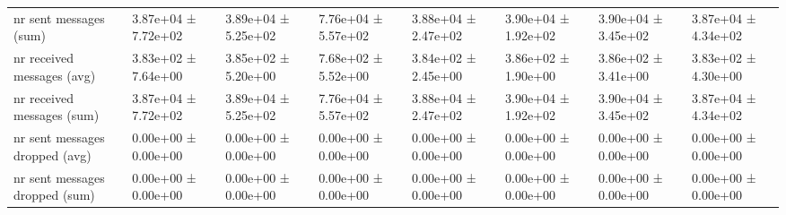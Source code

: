 \begin{tabular}{llllllll}
 nr sent messages (sum)             & 3.87e+04 ± 7.72e+02 & 3.89e+04 ± 5.25e+02 & 7.76e+04 ± 5.57e+02 & 3.88e+04 ± 2.47e+02 & 3.90e+04 ± 1.92e+02 & 3.90e+04 ± 3.45e+02 & 3.87e+04 ± 4.34e+02 \\
 nr received messages (avg)         & 3.83e+02 ± 7.64e+00 & 3.85e+02 ± 5.20e+00 & 7.68e+02 ± 5.52e+00 & 3.84e+02 ± 2.45e+00 & 3.86e+02 ± 1.90e+00 & 3.86e+02 ± 3.41e+00 & 3.83e+02 ± 4.30e+00 \\
 nr received messages (sum)         & 3.87e+04 ± 7.72e+02 & 3.89e+04 ± 5.25e+02 & 7.76e+04 ± 5.57e+02 & 3.88e+04 ± 2.47e+02 & 3.90e+04 ± 1.92e+02 & 3.90e+04 ± 3.45e+02 & 3.87e+04 ± 4.34e+02 \\
 nr sent messages dropped (avg)     & 0.00e+00 ± 0.00e+00 & 0.00e+00 ± 0.00e+00 & 0.00e+00 ± 0.00e+00 & 0.00e+00 ± 0.00e+00 & 0.00e+00 ± 0.00e+00 & 0.00e+00 ± 0.00e+00 & 0.00e+00 ± 0.00e+00 \\
 nr sent messages dropped (sum)     & 0.00e+00 ± 0.00e+00 & 0.00e+00 ± 0.00e+00 & 0.00e+00 ± 0.00e+00 & 0.00e+00 ± 0.00e+00 & 0.00e+00 ± 0.00e+00 & 0.00e+00 ± 0.00e+00 & 0.00e+00 ± 0.00e+00 \\
\hline
\end{tabular}